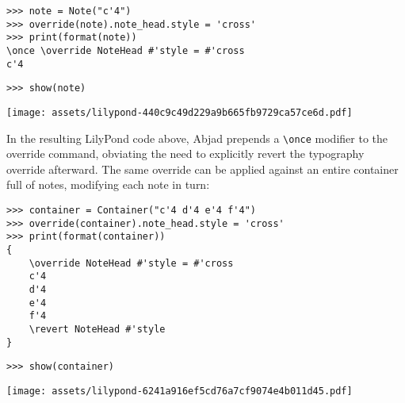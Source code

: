 \begin{comment}
<abjad>
note = Note("c'4")
override(note).note_head.style = 'cross'
print(format(note))
show(note)
</abjad>
\end{comment}

\begin{abjadbookoutput}
\begin{singlespacing}
\vspace{-0.5\baselineskip}
\begin{lstlisting}
>>> note = Note("c'4")
>>> override(note).note_head.style = 'cross'
>>> print(format(note))
\once \override NoteHead #'style = #'cross
c'4
\end{lstlisting}
\begin{lstlisting}
>>> show(note)
\end{lstlisting}
\noindent\texttt{[image: assets/lilypond-440c9c49d229a9b665fb9729ca57ce6d.pdf]}
\end{singlespacing}
\end{abjadbookoutput}

\noindent In the resulting LilyPond code above, Abjad prepends a
\texttt{\textbackslash{}once} modifier to the override command, obviating the
need to explicitly revert the typography override afterward. The same override
can be applied against an entire container full of notes, modifying each note
in turn:

\begin{comment}
<abjad>
container = Container("c'4 d'4 e'4 f'4")
override(container).note_head.style = 'cross'
print(format(container))
show(container)
</abjad>
\end{comment}

\begin{abjadbookoutput}
\begin{singlespacing}
\vspace{-0.5\baselineskip}
\begin{lstlisting}
>>> container = Container("c'4 d'4 e'4 f'4")
>>> override(container).note_head.style = 'cross'
>>> print(format(container))
{
    \override NoteHead #'style = #'cross
    c'4
    d'4
    e'4
    f'4
    \revert NoteHead #'style
}
\end{lstlisting}
\begin{lstlisting}
>>> show(container)
\end{lstlisting}
\noindent\texttt{[image: assets/lilypond-6241a916ef5cd76a7cf9074e4b011d45.pdf]}
\end{singlespacing}
\end{abjadbookoutput}

